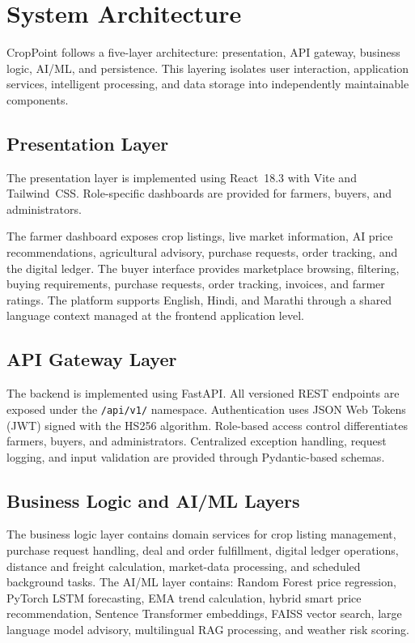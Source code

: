 \documentclass[conference]{IEEEtran}
\begin{document}
\section{System Architecture}

CropPoint follows a five-layer architecture: presentation, API
gateway, business logic, AI/ML, and persistence. This layering
isolates user interaction, application services, intelligent
processing, and data storage into independently maintainable
components.

\subsection{Presentation Layer}

The presentation layer is implemented using React~18.3 with Vite
and Tailwind~CSS. Role-specific dashboards are provided for
farmers, buyers, and administrators.

The farmer dashboard exposes crop listings, live market information,
AI price recommendations, agricultural advisory, purchase requests,
order tracking, and the digital ledger. The buyer interface provides
marketplace browsing, filtering, buying requirements, purchase
requests, order tracking, invoices, and farmer ratings. The platform
supports English, Hindi, and Marathi through a shared language
context managed at the frontend application level.

\subsection{API Gateway Layer}

The backend is implemented using FastAPI. All versioned REST
endpoints are exposed under the \texttt{/api/v1/} namespace.
Authentication uses JSON Web Tokens (JWT) signed with the HS256
algorithm. Role-based access control differentiates farmers, buyers,
and administrators. Centralized exception handling, request logging,
and input validation are provided through Pydantic-based schemas.

\subsection{Business Logic and AI/ML Layers}

The business logic layer contains domain services for crop listing
management, purchase request handling, deal and order fulfillment,
digital ledger operations, distance and freight calculation,
market-data processing, and scheduled background tasks. The AI/ML
layer contains: Random Forest price regression, PyTorch LSTM
forecasting, EMA trend calculation, hybrid smart price
recommendation, Sentence Transformer embeddings, FAISS vector
search, large language model advisory, multilingual RAG processing,
and weather risk scoring.
\end{document}
